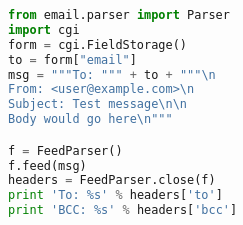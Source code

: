 \begin{lstlisting}[language=Python,caption={Python program with e-mail
      header injection vulnerability.},label={code:pyemi}, float]
from email.parser import Parser
import cgi
form = cgi.FieldStorage()
to = form["email"]
msg = """To: """ + to + """\n
From: <user@example.com>\n
Subject: Test message\n\n
Body would go here\n"""

f = FeedParser() 
f.feed(msg)
headers = FeedParser.close(f)
print 'To: %s' % headers['to']
print 'BCC: %s' % headers['bcc']
\end{lstlisting}
